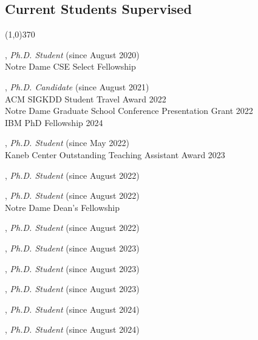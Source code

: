 \documentclass[10pt]{article}
\newenvironment{myindentpar}[1]%
{\begin{list}{}%
         {\setlength{\leftmargin}{#1}}%
         \item[]%
}
{\end{list}}
\newcounter{list}
\begin{document}
\subsection{\sc Current Students Supervised}
\vspace{-0.4cm} \line(1,0){370} \vspace{-0.1cm}

\begin{myindentpar}{0.75cm}

\hspace{-0.75cm}{\bf Mengxia Yu}, \textit{Ph.D. Student} (since August 2020) \\
	{Notre Dame CSE Select Fellowship}

\hspace{-0.75cm}{\bf Gang Liu}, \textit{Ph.D. Candidate} (since August 2021) \\
	{ACM SIGKDD Student Travel Award 2022} \\
	{Notre Dame Graduate School Conference Presentation Grant 2022} \\
	{IBM PhD Fellowship 2024}

\hspace{-0.75cm}{\bf Noah Ziems}, \textit{Ph.D. Student} (since May 2022) \\
	{Kaneb Center Outstanding Teaching Assistant Award 2023}

\hspace{-0.75cm}{\bf Hy Dang}, \textit{Ph.D. Student} (since August 2022)

\hspace{-0.75cm}{\bf Eric Inae}, \textit{Ph.D. Student} (since August 2022) \\
	{Notre Dame Dean's Fellowship}

\hspace{-0.75cm}{\bf Bang Nguyen}, \textit{Ph.D. Student} (since August 2022)

\hspace{-0.75cm}{\bf Mengzhao Jia}, \textit{Ph.D. Student} (since August 2023)

\hspace{-0.75cm}{\bf Zheyuan (Frank) Liu}, \textit{Ph.D. Student} (since August 2023)

\hspace{-0.75cm}{\bf Zhaoxuan Tan}, \textit{Ph.D. Student} (since August 2023)

\hspace{-0.75cm}{\bf Yining Lu}, \textit{Ph.D. Student} (since August 2024)

\hspace{-0.75cm}{\bf Yihan Zhu}, \textit{Ph.D. Student} (since August 2024)


\end{myindentpar}
\end{document}
